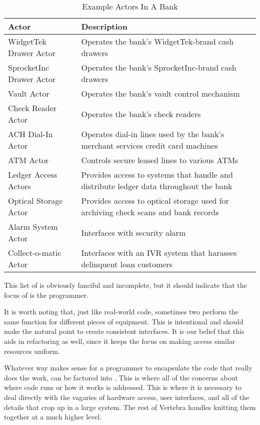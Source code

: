 \begin{table}
	\begin{center}
		\begin{tabular}{|p{}|p{}|}
			\hline Actor & Description \\
			\hline
			\hline WidgetTek Drawer Actor & Operates the bank's WidgetTek-brand cash drawers \\
			\hline SprocketInc Drawer Actor & Operates the bank's SprocketInc-brand cash drawers \\
			\hline Vault Actor & Operates the bank's vault control mechanism \\
			\hline Check Reader Actor & Operates the bank's check readers \\
			\hline ACH Dial-In Actor & Operates dial-in lines used by the bank's merchant services credit card machines \\
			\hline ATM Actor & Controls secure leased lines to various ATMs \\
			\hline Ledger Access Actors & Provides access to systems that handle and distribute ledger data throughout the bank \\
			\hline Optical Storage Actor & Provides access to optical storage used for archiving check scans and bank records \\
			\hline Alarm System Actor & Interfaces with security alarm \\
			\hline Collect-o-matic Actor & Interfaces with an IVR system that harasses delinquent loan customers \\
			\hline
		\end{tabular}
	\end{center}
	\caption{Example Actors In A Bank}
	\label{tbl:bank-actors}
\end{table}

This list of \actors{} is obviously fanciful and incomplete, but it should indicate that the focus of \actors{} is the programmer.

It is worth noting that, just like real-world code, sometimes two \actors{} perform the same function for different pieces of equipment.  This is intentional and should make \actors{} the natural point to create consistent interfaces.  It is our belief that this aids in refactoring as well, since it keeps the focus on making access similar resources uniform.

Whatever way makes sense for a programmer to encapsulate the code that really does the work, can be factored into \actors{}.  This is where all of the concerns about where code runs or how it works is addressed.  This is where it is necessary to deal directly with the vagaries of hardware access, user interfaces, and all of the details that crop up in a large system.  The rest of Vertebra handles knitting them together at a much higher level.
